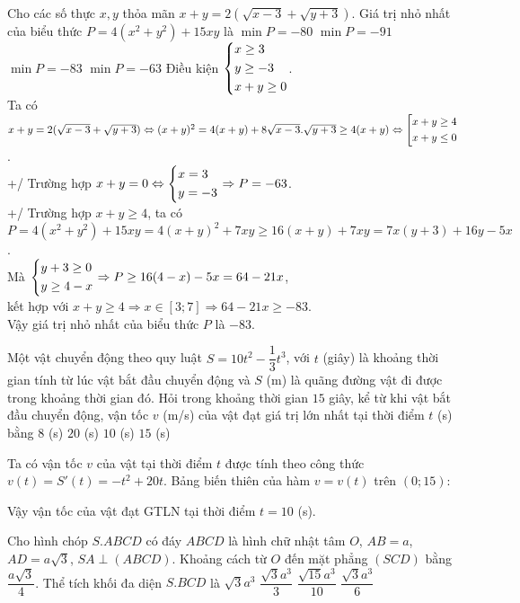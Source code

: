 \begin{ex}%
Cho các số thực $x, y$ thỏa mãn $x+y=2(\sqrt{x-3}+\sqrt{y+3})$. Giá trị nhỏ nhất của biểu thức $P=4(x^2+y^2)+15xy$ là
\choice
{$\min P=-80$}
{$\min P=-91$}
{\True $\min P=-83$}
{$\min P=-63$}
\loigiai
{
Điều kiện $\left\{\begin{aligned}&x\geq3\\& y\geq-3\\& x+y\geq0\end{aligned}\right.$.\\
	Ta có $x+y=2(\sqrt{x-3}+\sqrt{y+3})\Leftrightarrow (x+y)^2=4(x+y)+8\sqrt{x-3}.\sqrt{y+3}\geq 4(x+y)\Leftrightarrow \left[\begin{aligned}&x+y\geq 4\\&x+y\leq 0\end{aligned}\right.$.\\
	+/ Trường hợp $x+y=0\Leftrightarrow\left\{\begin{aligned}&x=3\\&y=-3\end{aligned}\right.\Rightarrow P=-63$.\\
    +/ Trường hợp $x+y\geq4$, ta có $P=4(x^2+y^2)+15xy=4(x+y)^2+7xy\geq 16(x+y)+7xy=7x(y+3)+16y-5x$.\\
	Mà $\left\{\begin{aligned}&y+3\geq 0\\&y\geq 4-x\end{aligned}\right.\Rightarrow P\geq16(4-x)-5x=64-21x$,\\ kết hợp với $x+y\geq 4\Rightarrow x\in[3;7]\Rightarrow 64-21x\geq -83$.\\
	Vậy giá trị nhỏ nhất của biểu thức $P$ là $-83$.
}
\end{ex}


\begin{ex}%
Một vật chuyển động theo quy luật $S=10t^2-\dfrac{1}{3}t^3$, với $t$ (giây) là khoảng thời gian tính từ lúc vật bắt đầu chuyển động và $S$ (m) là quãng đường vật đi được trong khoảng thời gian đó. Hỏi trong khoảng thời gian $15$ giây, kể từ khi vật bắt đầu chuyển động, vận tốc $v$ (m/s) của vật đạt giá trị lớn nhất tại thời điểm $t$ (s) bằng
\choice
{$8$ (s)}
{$20$ (s)}
{\True $10$ (s)}
{$15$ (s)}
\loigiai
{Ta có vận tốc $v$ của vật tại thời điểm $t$ được tính theo công thức $v(t)=S'(t)=-t^2+20t$. Bảng biến thiên của hàm $v=v(t)$ trên $(0; 15)$:
\vspace*{-10pt}
\begin{center}
\immini{}
{
}
\end{center}
Vậy vận tốc của vật đạt GTLN tại thời điểm $t=10$ (s).
}
\end{ex}


\begin{ex}%
Cho hình chóp $S.ABCD$ có đáy $ABCD$ là hình chữ nhật tâm $O$, $AB=a$, $AD=a\sqrt{3}$, $SA\perp (ABCD)$. Khoảng cách từ $O$ đến mặt phẳng $(SCD)$ bằng $\dfrac{a\sqrt{3}}{4}$. Thể tích khối đa diện $S.BCD$ là
\choice
{$\sqrt{3}a^3$}
{$\dfrac{\sqrt{3}a^3}{3}$}
{$\dfrac{\sqrt{15}a^3}{10}$}
{\True $\dfrac{\sqrt{3}a^3}{6}$}
\end{ex}

